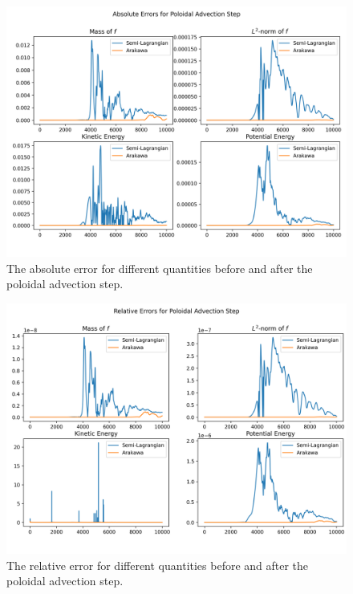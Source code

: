 \begin{figure}
	\centering
	\includegraphics[width=0.9\linewidth]{plots/abs_err}
	\caption{The absolute error for different quantities before and after the poloidal advection step.}
	\label{fig:abserr}
\end{figure}


\begin{figure}
	\centering
	\includegraphics[width=0.9\linewidth]{plots/rel_err}
	\caption{The relative error for different quantities before and after the poloidal advection step.}
	\label{fig:relerr}
\end{figure}


